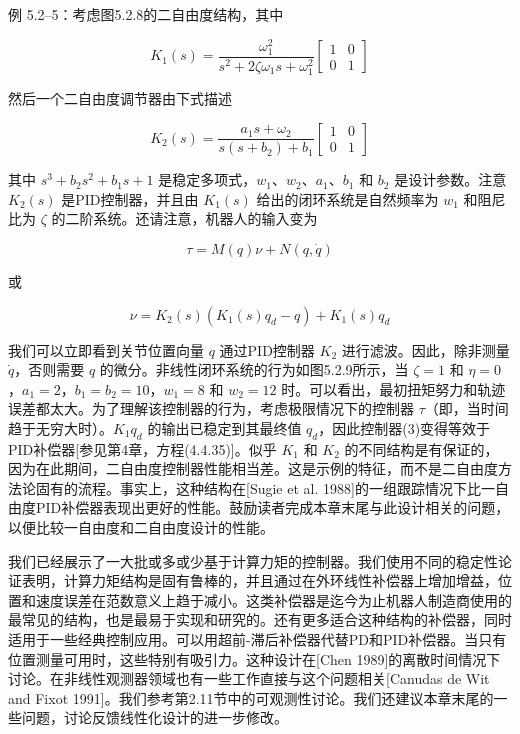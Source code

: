 \documentclass[UTF8,12pt,a4paper]{ctexart}
\begin{document}
\begin{example}[动态二自由度设计]
例 5.2--5：考虑图5.2.8的二自由度结构，其中

\begin{equation}
K_1(s) = \frac{\omega_1^2}{s^2 + 2\zeta\omega_1 s + \omega_1^2}\begin{bmatrix} 1 & 0 \\ 0 & 1 \end{bmatrix}
\end{equation}

然后一个二自由度调节器由下式描述

\begin{equation}
K_2(s) = \frac{a_1 s + \omega_2}{s(s + b_2) + b_1}\begin{bmatrix} 1 & 0 \\ 0 & 1 \end{bmatrix}
\end{equation}

其中 $s^3 + b_2s^2 + b_1s + 1$ 是稳定多项式，$w_1$、$w_2$、$a_1$、$b_1$ 和 $b_2$ 是设计参数。注意 $K_2(s)$ 是PID控制器，并且由 $K_1(s)$ 给出的闭环系统是自然频率为 $w_1$ 和阻尼比为 $\zeta$ 的二阶系统。还请注意，机器人的输入变为

\begin{equation}
\tau = M(q)\nu + N(q, \dot{q})
\end{equation}

或

\begin{equation}
\nu = K_2(s)(K_1(s)q_d - q) + K_1(s)q_d
\end{equation}

我们可以立即看到关节位置向量 $q$ 通过PID控制器 $K_2$ 进行滤波。因此，除非测量 $\dot{q}$，否则需要 $q$ 的微分。非线性闭环系统的行为如图5.2.9所示，当 $\zeta = 1$ 和 $\eta = 0$，$a_1 = 2$，$b_1 = b_2 = 10$，$w_1 = 8$ 和 $w_2 = 12$ 时。可以看出，最初扭矩努力和轨迹误差都太大。为了理解该控制器的行为，考虑极限情况下的控制器 $\tau$（即，当时间趋于无穷大时）。$K_1q_d$ 的输出已稳定到其最终值 $q_d$，因此控制器(3)变得等效于PID补偿器[参见第4章，方程(4.4.35)]。似乎 $K_1$ 和 $K_2$ 的不同结构是有保证的，因为在此期间，二自由度控制器性能相当差。这是示例的特征，而不是二自由度方法论固有的流程。事实上，这种结构在[Sugie et al. 1988]的一组跟踪情况下比一自由度PID补偿器表现出更好的性能。鼓励读者完成本章末尾与此设计相关的问题，以便比较一自由度和二自由度设计的性能。
\end{example}

我们已经展示了一大批或多或少基于计算力矩的控制器。我们使用不同的稳定性论证表明，计算力矩结构是固有鲁棒的，并且通过在外环线性补偿器上增加增益，位置和速度误差在范数意义上趋于减小。这类补偿器是迄今为止机器人制造商使用的最常见的结构，也是最易于实现和研究的。还有更多适合这种结构的补偿器，同时适用于一些经典控制应用。可以用超前-滞后补偿器代替PD和PID补偿器。当只有位置测量可用时，这些特别有吸引力。这种设计在[Chen 1989]的离散时间情况下讨论。在非线性观测器领域也有一些工作直接与这个问题相关[Canudas de Wit and Fixot 1991]。我们参考第2.11节中的可观测性讨论。我们还建议本章末尾的一些问题，讨论反馈线性化设计的进一步修改。
\end{document}
